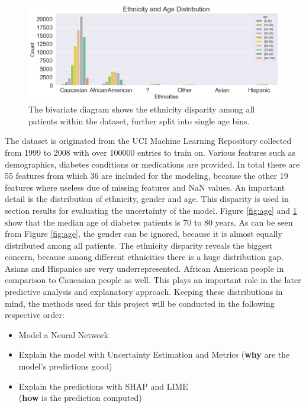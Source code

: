 \documentclass[journal]{IEEEtran}
\begin{document}
\begin{figure}
	\centering
	\includegraphics[width=1\linewidth]{../imgs/ethnicities_new}
	\caption{The bivariate diagram shows the ethnicity disparity among all patients within the dataset, further split into single age bins.}
	\label{fig:eth}
\end{figure}

\noindent The dataset is originated from the UCI Machine Learning Repository \cite{uci} collected from 1999 to 2008 with over 100000 entries to train on. Various features such as demographics, diabetes conditions or medications are provided. In total there are 55 features from which 36 are included for the modeling, because the other 19 features where useless due of missing features and NaN values. An important detail is the distribution of ethnicity, gender and age. This disparity is used in section results for evaluating the uncertainty of the model. Figure \ref{fig:age} and \ref{fig:eth} show that the median age of diabetes patients is 70 to 80 years. As can be seen from Figure \ref{fig:age}, the gender can be ignored, because it is almost equally distributed among all patients. The ethnicity disparity reveals the biggest concern, because among different ethnicities there is a huge distribution gap. Asians and Hispanics are very underrepresented. African American people in comparison to Caucasian people as well. This plays an important role in the later predictive analysis and explanatory approach. Keeping these distributions in mind, the methods used for this project will be conducted in the following respective order: \\

\begin{itemize}
	\item Model a Neural Network 
	\item Explain the model with Uncertainty Estimation and Metrics (\textbf{why} are the model's predictions good)
	\item Explain the predictions with SHAP and LIME \\ (\textbf{how} is the prediction computed) \\
\end{itemize}
\end{document}
